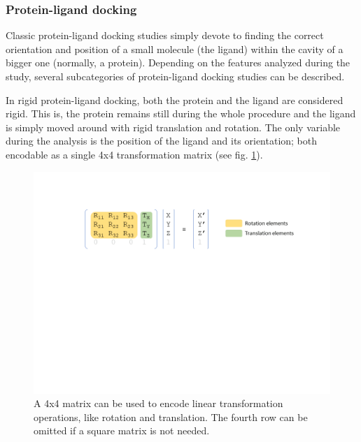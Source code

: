 \subsubsection{Protein-ligand docking}
Classic protein-ligand docking studies simply devote to finding the correct orientation and position of a small molecule (the ligand) within the cavity of a bigger one (normally, a protein). Depending on the features analyzed during the study, several subcategories of protein-ligand docking studies can be described.

In rigid protein-ligand docking, both the protein and the ligand are considered rigid. This is, the protein remains still during the whole procedure and the ligand is simply moved around with rigid translation and rotation. The only variable during the analysis is the position of the ligand and its orientation; both encodable as a single 4x4 transformation matrix (see fig. \ref{fig:xform-matrices}).


\begin{figure}[H] %
	\begin{Center}
		\includegraphics[width=\textwidth]{./figures/06/xform-matrices.png}
	\end{Center}
	\caption[Transformation matrices]{A 4x4 matrix can be used to encode linear transformation operations, like rotation and translation. The fourth row can be omitted if a square matrix is not needed.}
	\label{fig:xform-matrices}
\end{figure}






